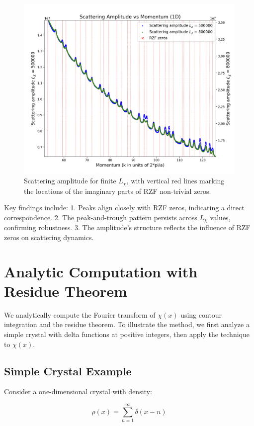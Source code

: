 \documentclass[11pt, oneside]{article}
\begin{document}
\begin{figure}[htbp]
\centering
\includegraphics[width=0.8\linewidth]{zoomed_scattering.png}
\caption{Scattering amplitude for finite $L_{\chi}$, with vertical red lines marking the locations of the imaginary parts of RZF non-trivial zeros.}
\label{fig:scattering_amplitude}
\end{figure}

Key findings include:
1. Peaks align closely with RZF zeros, indicating a direct correspondence.
2. The peak-and-trough pattern persists across $L_{\chi}$ values, confirming robustness.
3. The amplitude’s structure reflects the influence of RZF zeros on scattering dynamics.

\section{Analytic Computation with Residue Theorem}

We analytically compute the Fourier transform of $\chi(x)$ using contour integration and the residue theorem. To illustrate the method, we first analyze a simple crystal with delta functions at positive integers, then apply the technique to $\chi(x)$.

\subsection{Simple Crystal Example}

Consider a one-dimensional crystal with density:

\begin{equation}
\rho(x) = \sum_{n=1}^{\infty} \delta(x - n)
\end{equation}
\end{document}
